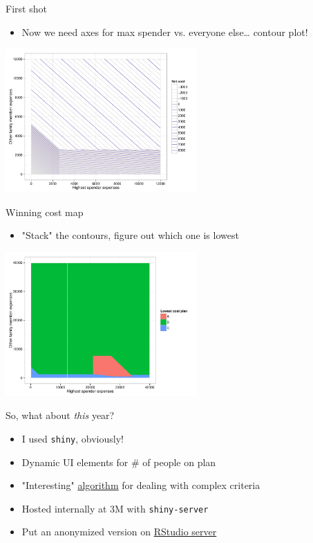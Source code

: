 \documentclass[sans,aspectratio=169,presentation,bigger,fleqn]{beamer}
\begin{document}
\begin{frame}[label=sec-15]{First shot}
\begin{itemize}
\item Now we need axes for max spender vs. everyone else\ldots{} contour plot!
\end{itemize}

\begin{center}
\includegraphics[height=5.5cm]{./img/ins-contour.pdf}
\end{center}
\end{frame}
\begin{frame}[label=sec-16]{Winning cost map}
\begin{itemize}
\item "Stack" the contours, figure out which one is lowest
\end{itemize}

\begin{center}
\includegraphics[height=5.5cm]{./img/ins-cost-map.pdf}
\end{center}
\end{frame}
\begin{frame}[fragile,label=sec-17]{So, what about \emph{this} year?}
 \begin{itemize}
\item I used \texttt{shiny}, obviously!
\item Dynamic UI elements for \# of people on plan
\item "Interesting" \href{http://stackoverflow.com/questions/18116967/dealing-with-conditionals-in-a-better-manner-than-deeply-nested-ifelse-blocks}{algorithm} for dealing with complex criteria
\item Hosted internally at 3M  with \texttt{shiny-server}
\item Put an anonymized version on \href{http://spark.rstudio.com/jwhendy/insurance-visualizer}{RStudio server}
\end{itemize}
\end{frame}
\end{document}
